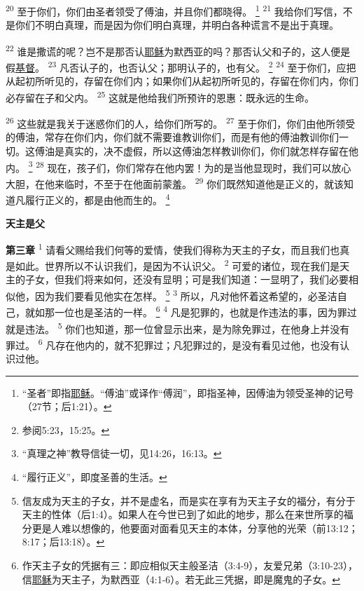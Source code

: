 \textsuperscript{20}
至于你们，你们由圣者领受了傅油，并且你们都晓得。
\footnote{“圣者”即指\uline{耶稣}。“傅油”或译作“傅润”，即指圣神，因傅油为领受圣神的记号（27节；后1:21）。}
\textsuperscript{21}
我给你们写信，不是你们不明白真理，而是因为你们明白真理，并明白各种谎言不是出于真理。

\textsuperscript{22}
谁是撒谎的呢？岂不是那否认\uline{耶稣}为默西亚的吗？那否认父和子的，这人便是假\uline{基督}。
\textsuperscript{23}
凡否认子的，也否认父；那明认子的，也有父。
\footnote{参阅5:23，15:25。}
\textsuperscript{24}
至于你们，应把从起初所听见的，存留在你们内；如果你们从起初所听见的，存留在你们内，你们必存留在子和父内。
\textsuperscript{25}
这就是他给我们所预许的恩惠：既永远的生命。

\textsuperscript{26}
这些就是我关于迷惑你们的人，给你们所写的。
\textsuperscript{27}
至于你们，你们由他所领受的傅油，常存在你们内，你们就不需要谁教训你们，而是有他的傅油教训你们一切。这傅油是真实的，决不虚假，所以这傅油怎样教训你们，你们就怎样存留在他内。
\footnote{“真理之神”教导信徒一切，见14:26，16:13。}
\textsuperscript{28}
现在，孩子们，你们常存在他内罢！为的是当他显现时，我们可以放心大胆，在他来临时，不至于在他面前蒙羞。
\textsuperscript{29}
你们既然知道他是正义的，就该知道凡履行正义的，都是由他而生的。
\footnote{“履行正义”，即度圣善的生活。}

\begin{center}
	\textbf{\large{\songti 天主是父}}
\end{center}

\textbf{第三章\quad}
\textsuperscript{1}
请看父赐给我们何等的爱情，使我们得称为天主的子女，而且我们也真是如此。世界所以不认识我们，是因为不认识父。
\textsuperscript{2}
可爱的诸位，现在我们是天主的子女，但我们将来如何，还没有显明；可是我们知道：一显明了，我们必要相似他，因为我们要看见他实在怎样。
\footnote{信友成为天主的子女，并不是虚名，而是实在享有为天主子女的福分，有分于天主的性体（后1:4）。如果人在今世已到了如此的地步，那么在来世所享的福分更是人难以想像的，他要面对面看见天主的本体，分享他的光荣（前13:12；8:17；后13:18）。}
\textsuperscript{3}
所以，凡对他怀着这希望的，必圣洁自己，就如那一位也是圣洁的一样。
\footnote{作天主子女的凭据有三：即应相似天主般圣洁（3:4-9），友爱兄弟（3:10-23），信\uline{耶稣}为天主子，为默西亚（4:1-6）。若无此三凭据，即是魔鬼的子女。}
\textsuperscript{4}
凡是犯罪的，也就是作违法的事，因为罪过就是违法。
\textsuperscript{5}
你们也知道，那一位曾显示出来，是为除免罪过，在他身上并没有罪过。
\textsuperscript{6}
凡存在他内的，就不犯罪过；凡犯罪过的，是没有看见过他，也没有认识过他。

